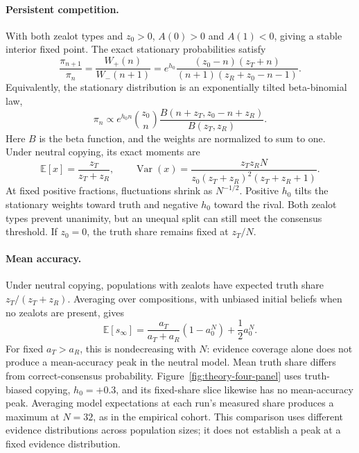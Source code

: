 \paragraph{Persistent competition.}
With both zealot types and \(z_0>0\), \(A(0)>0\) and \(A(1)<0\), giving a stable interior fixed point. The exact stationary probabilities satisfy
\begin{equation}
 \frac{\pi_{n+1}}{\pi_n}
 =\frac{W_+(n)}{W_-(n+1)}
 =e^{h_0}\frac{(z_0-n)(z_T+n)}{(n+1)(z_R+z_0-n-1)}.
 \label{eq:stationary-recurrence}
\end{equation}
Equivalently, the stationary distribution is an exponentially tilted beta-binomial law,
\begin{equation}
 \pi_n\propto e^{h_0n}\binom{z_0}{n}
 \frac{B(n+z_T,z_0-n+z_R)}{B(z_T,z_R)}.
 \label{eq:stationary-count}
\end{equation}
Here \(B\) is the beta function, and the weights are normalized to sum to one. Under neutral copying, its exact moments are \citep{mobilia2007zealotry}
\begin{equation}
 \mathbb E[x]=\frac{z_T}{z_T+z_R},\qquad
 \operatorname{Var}(x)
 =\frac{z_Tz_RN}{z_0(z_T+z_R)^2(z_T+z_R+1)}.
 \label{eq:neutral-moments}
\end{equation}
At fixed positive fractions, fluctuations shrink as \(N^{-1/2}\). Positive \(h_0\) tilts the stationary weights toward truth and negative \(h_0\) toward the rival. Both zealot types prevent unanimity, but an unequal split can still meet the consensus threshold. If \(z_0=0\), the truth share remains fixed at \(z_T/N\).

\paragraph{Mean accuracy.}
Under neutral copying, populations with zealots have expected truth share \(z_T/(z_T+z_R)\). Averaging over compositions, with unbiased initial beliefs when no zealots are present, gives
\begin{equation}
 \mathbb E[s_\infty]
 =\frac{a_T}{a_T+a_R}(1-a_0^N)+\frac12a_0^N.
 \label{eq:neutral-mean-accuracy}
\end{equation}
For fixed \(a_T>a_R\), this is nondecreasing with \(N\): evidence coverage alone does not produce a mean-accuracy peak in the neutral model. Mean truth share differs from correct-consensus probability. Figure~\ref{fig:theory-four-panel} uses truth-biased copying, \(h_0=+0.3\), and its fixed-share slice likewise has no mean-accuracy peak. Averaging model expectations at each run's measured share produces a maximum at \(N=32\), as in the empirical cohort. This comparison uses different evidence distributions across population sizes; it does not establish a peak at a fixed evidence distribution.

